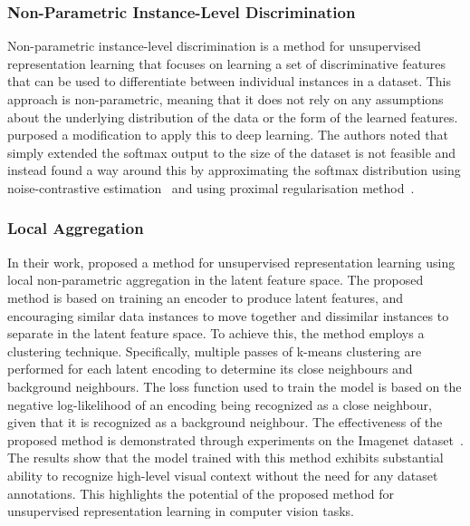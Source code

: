 \subsubsection{Non-Parametric Instance-Level Discrimination}
\label{subsubsec:non-parametric_instance-level_discrimination}
Non-parametric instance-level discrimination is a method for unsupervised representation learning that focuses on learning a set of discriminative features that can be used to differentiate between individual instances in a dataset. This approach is non-parametric, meaning that it does not rely on any assumptions about the underlying distribution of the data or the form of the learned features. \cite{wu2018unsupervised} purposed a modification to apply this to deep learning. The authors noted that simply extended the softmax output to the size of the dataset is not feasible and instead found a way around this by approximating the softmax distribution using noise-contrastive estimation~\citep{gutmann2010noise} and using proximal regularisation method~\citep{parikh2014proximal}.

\subsubsection{Local Aggregation}
\label{subsubsec:local_aggregation}
In their work, \cite{zhuang2019local} proposed a method for unsupervised representation learning using local non-parametric aggregation in the latent feature space. The proposed method is based on training an encoder to produce latent features, and encouraging similar data instances to move together and dissimilar instances to separate in the latent feature space. To achieve this, the method employs a clustering technique. Specifically, multiple passes of k-means clustering are performed for each latent encoding to determine its close neighbours and background neighbours. The loss function used to train the model is based on the negative log-likelihood of an encoding being recognized as a close neighbour, given that it is recognized as a background neighbour. The effectiveness of the proposed method is demonstrated through experiments on the Imagenet dataset~\citep{deng2009imagenet}. The results show that the model trained with this method exhibits substantial ability to recognize high-level visual context without the need for any dataset annotations. This highlights the potential of the proposed method for unsupervised representation learning in computer vision tasks.

